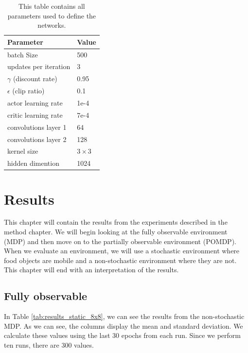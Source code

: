 \documentclass[12pt,A4]{report}
\theoremstyle{definition}
\begin{document}
\begin{table}[H]
  \centering
  \caption{This table contains all parameters used to define the networks.}
  \begin{tabular}{l|l}
    Parameter & Value \\ \hline
    batch Size & 500 \\
    updates per iteration & 3 \\
    $\gamma$ (discount rate) & 0.95 \\
    $\epsilon$ (clip ratio) & 0.1 \\
    actor learning rate & 1e-4 \\
    critic learning rate & 7e-4 \\
    convolutions layer 1 & 64 \\
    convolutions layer 2 & 128 \\
    kernel size & $3 \times 3$\\
    hidden dimention & 1024 \\
  \end{tabular}
  \label{tab:train_parms}
\end{table}


\chapter{Results}
This chapter will contain the results from the experiments described in the method chapter. We will begin looking at the fully observable environment (MDP) and then move on to the partially observable environment (POMDP). When we evaluate an environment, we will use a stochastic environment where food objects are mobile and a non-stochastic environment where they are not. This chapter will end with an interpretation of the results.

\section{Fully observable}
In Table \ref{tab:results_static_8x8}, we can see the results from the non-stochastic MDP. As we can see, the columns display the mean and standard deviation. We calculate these values using the last 30 epochs from each run. Since we perform ten runs, there are 300 values. 
\end{document}
